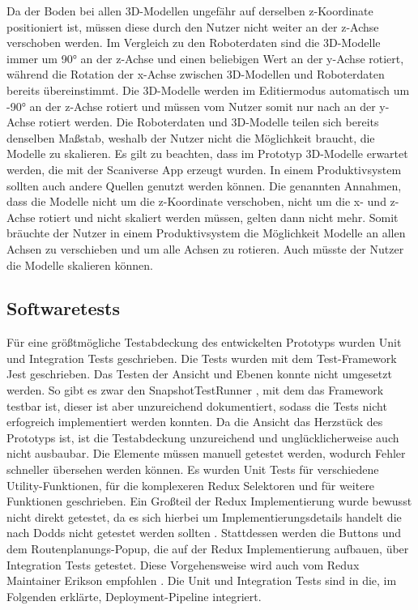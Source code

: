 Da der Boden bei allen 3D-Modellen ungefähr auf derselben z-Koordinate positioniert ist, müssen diese durch den Nutzer nicht weiter an der z-Achse verschoben werden. Im Vergleich zu den Roboterdaten sind die 3D-Modelle immer um 90° an der z-Achse und einen beliebigen Wert an der y-Achse rotiert, während die Rotation der x-Achse zwischen 3D-Modellen und Roboterdaten bereits übereinstimmt. Die 3D-Modelle werden im Editiermodus automatisch um -90° an der z-Achse rotiert und müssen vom Nutzer somit nur nach an der y-Achse rotiert werden. Die Roboterdaten und 3D-Modelle teilen sich bereits denselben Maßstab, weshalb der Nutzer nicht die Möglichkeit braucht, die Modelle zu skalieren. Es gilt zu beachten, dass im Prototyp 3D-Modelle erwartet werden, die mit der Scaniverse App erzeugt wurden. In einem Produktivsystem sollten auch andere Quellen genutzt werden können. Die genannten Annahmen, dass die Modelle nicht um die z-Koordinate verschoben, nicht um die x- und z-Achse rotiert und nicht skaliert werden müssen, gelten dann nicht mehr. Somit bräuchte der Nutzer in einem Produktivsystem die Möglichkeit Modelle an allen Achsen zu verschieben und um alle Achsen zu rotieren. Auch müsste der Nutzer die Modelle skalieren können.

\subsection{Softwaretests}
Für eine größtmögliche Testabdeckung des entwickelten Prototyps wurden Unit und Integration Tests geschrieben. Die Tests wurden mit dem Test-Framework Jest \cite{Jest} geschrieben. Das Testen der \deckgl{} Ansicht und Ebenen konnte nicht umgesetzt werden. So gibt es zwar den SnapshotTestRunner \cite{DeckglSnapshotTestRunner}, mit dem das Framework testbar ist, dieser ist aber unzureichend dokumentiert, sodass die Tests nicht erfogreich implementiert werden konnten. Da die \deckgl{} Ansicht das Herzstück des Prototyps ist, ist die Testabdeckung unzureichend und unglücklicherweise auch nicht ausbaubar. Die \deckgl{} Elemente müssen manuell getestet werden, wodurch Fehler schneller übersehen werden können. Es wurden Unit Tests für verschiedene Utility-Funktionen, für die komplexeren Redux Selektoren und für weitere Funktionen geschrieben. Ein Großteil der Redux Implementierung wurde bewusst nicht direkt getestet, da es sich hierbei um Implementierungsdetails handelt die nach Dodds nicht getestet werden sollten \cite{Dodds}. Stattdessen werden die Buttons und dem Routenplanungs-Popup, die auf der Redux Implementierung aufbauen, über Integration Tests getestet. Diese Vorgehensweise wird auch vom Redux Maintainer Erikson empfohlen \cite{Erikson}. Die Unit und Integration Tests sind in die, im Folgenden erklärte, Deployment-Pipeline integriert.

